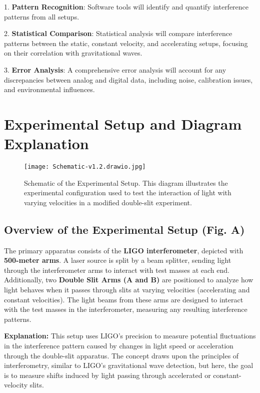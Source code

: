\documentclass{article}
\begin{document}
1. \textbf{Pattern Recognition}: Software tools will identify and quantify interference patterns from all setups.
   
2. \textbf{Statistical Comparison}: Statistical analysis will compare interference patterns between the static, constant velocity, and accelerating setups, focusing on their correlation with gravitational waves.
   
3. \textbf{Error Analysis}: A comprehensive error analysis will account for any discrepancies between analog and digital data, including noise, calibration issues, and environmental influences.

\section{Experimental Setup and Diagram Explanation}

\begin{figure}[h]
    \centering
    \texttt{[image: Schematic-v1.2.drawio.jpg]} %
    \caption{Schematic of the Experimental Setup. This diagram illustrates the experimental configuration used to test the interaction of light with varying velocities in a modified double-slit experiment.}
    \label{fig:experiment_setup}
\end{figure}
\subsection{Overview of the Experimental Setup (Fig. A)}

The primary apparatus consists of the \textbf{LIGO interferometer}, depicted with \textbf{500-meter arms}. A laser source is split by a beam splitter, sending light through the interferometer arms to interact with test masses at each end. Additionally, two \textbf{Double Slit Arms (A and B)} are positioned to analyze how light behaves when it passes through slits at varying velocities (accelerating and constant velocities). The light beams from these arms are designed to interact with the test masses in the interferometer, measuring any resulting interference patterns.

\textbf{Explanation:} This setup uses LIGO's precision to measure potential fluctuations in the interference pattern caused by changes in light speed or acceleration through the double-slit apparatus. The concept draws upon the principles of interferometry, similar to LIGO's gravitational wave detection, but here, the goal is to measure shifts induced by light passing through accelerated or constant-velocity slits.
\end{document}
